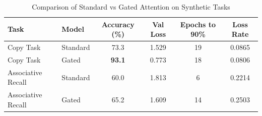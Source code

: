 \begin{table}[h]
\centering
\caption{Comparison of Standard vs Gated Attention on Synthetic Tasks}
\label{tab:gated_attention}
\begin{tabular}{llcccc}
\toprule
Task & Model & Accuracy (\%) & Val Loss & Epochs to 90\% & Loss Rate \\
\midrule
Copy Task & Standard & 73.3 & 1.529 & 19 & 0.0865 \\
Copy Task & Gated & \textbf{93.1} & 0.773 & 18 & 0.0806 \\
\midrule
Associative Recall & Standard & 60.0 & 1.813 & 6 & 0.2214 \\
Associative Recall & Gated & 65.2 & 1.609 & 14 & 0.2503 \\
\bottomrule
\end{tabular}
\end{table}